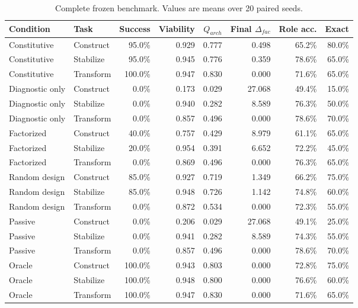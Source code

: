\begin{table}[p]
\centering
\scriptsize
\setlength{\tabcolsep}{3.7pt}
\begin{tabular}{llrrrrrr}
\toprule
Condition & Task & Success & Viability & $Q_{arch}$ & Final $\Delta_{fac}$ & Role acc. & Exact \\
\midrule
Constitutive & Construct & 95.0\% & 0.929 & 0.777 & 0.498 & 65.2\% & 80.0\% \\
Constitutive & Stabilize & 95.0\% & 0.945 & 0.776 & 0.359 & 78.6\% & 65.0\% \\
Constitutive & Transform & 100.0\% & 0.947 & 0.830 & 0.000 & 71.6\% & 65.0\% \\
\addlinespace[2pt]
Diagnostic only & Construct & 0.0\% & 0.173 & 0.029 & 27.068 & 49.4\% & 15.0\% \\
Diagnostic only & Stabilize & 0.0\% & 0.940 & 0.282 & 8.589 & 76.3\% & 50.0\% \\
Diagnostic only & Transform & 0.0\% & 0.857 & 0.496 & 0.000 & 78.6\% & 70.0\% \\
\addlinespace[2pt]
Factorized & Construct & 40.0\% & 0.757 & 0.429 & 8.979 & 61.1\% & 65.0\% \\
Factorized & Stabilize & 20.0\% & 0.954 & 0.391 & 6.652 & 72.2\% & 45.0\% \\
Factorized & Transform & 0.0\% & 0.869 & 0.496 & 0.000 & 76.3\% & 65.0\% \\
\addlinespace[2pt]
Random design & Construct & 85.0\% & 0.927 & 0.719 & 1.349 & 66.2\% & 75.0\% \\
Random design & Stabilize & 85.0\% & 0.948 & 0.726 & 1.142 & 74.8\% & 60.0\% \\
Random design & Transform & 0.0\% & 0.872 & 0.534 & 0.000 & 72.3\% & 55.0\% \\
\addlinespace[2pt]
Passive & Construct & 0.0\% & 0.206 & 0.029 & 27.068 & 49.1\% & 25.0\% \\
Passive & Stabilize & 0.0\% & 0.941 & 0.282 & 8.589 & 74.3\% & 55.0\% \\
Passive & Transform & 0.0\% & 0.857 & 0.496 & 0.000 & 78.6\% & 70.0\% \\
\addlinespace[2pt]
Oracle & Construct & 100.0\% & 0.943 & 0.803 & 0.000 & 72.8\% & 75.0\% \\
Oracle & Stabilize & 100.0\% & 0.948 & 0.800 & 0.000 & 76.6\% & 60.0\% \\
Oracle & Transform & 100.0\% & 0.947 & 0.830 & 0.000 & 71.6\% & 65.0\% \\
\bottomrule
\end{tabular}
\caption{Complete frozen benchmark. Values are means over 20 paired seeds.}
\label{tab:full-results}
\end{table}
